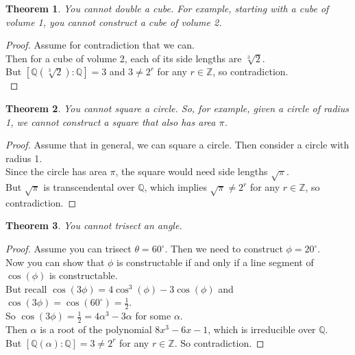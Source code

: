 \documentclass[11pt]{amsart}
\newtheorem{theorem}{Theorem}[section]
\theoremstyle{definition}
\newcommand{\rationals}{\mathbb{Q}}
\newcommand{\integers}{\mathbb{Z}}
\begin{document}
\begin{theorem}
	You cannot double a cube. For example, starting with a cube of volume 1, you cannot construct a cube of volume 2.
\end{theorem}
\begin{proof}
	Assume for contradiction that we can. \\
	Then for a cube of volume 2, each of its side lengths are $\sqrt[3]{2}$. \\
	But $[ \rationals(\sqrt[3]{2}) : \rationals ] = 3$ and $3 \neq 2^r$ for any $r \in \integers$, so contradiction. \\
\end{proof}
\begin{theorem}
	You cannot square a circle. So, for example, given a circle of radius 1, we cannot construct a square that also has area $\pi$.
\end{theorem}
\begin{proof}
	Assume that in general, we can square a circle. Then consider a circle with radius 1. \\
	Since the circle has area $\pi$, the square would need side lengths $\sqrt{\pi}$. \\
	But $\sqrt{\pi}$ is transcendental over $\rationals$, which implies $\sqrt{\pi} \neq 2^r$ for any $r \in \integers$, so contradiction.
\end{proof}
\begin{theorem}
	You cannot trisect an angle.
\end{theorem}
\begin{proof}
	Assume you can trisect $\theta = 60^\circ$. Then we need to construct $\phi = 20^\circ$. \\
	Now you can show that $\phi$ is constructable if and only if a line segment of $\cos(\phi)$ is constructable. \\
	But recall $\cos(3\phi) = 4\cos^3(\phi) - 3\cos(\phi)$ and $\cos(3\phi) = \cos(60^\circ) = \frac{1}{2}$. \\
	So $\cos(3\phi) = \frac{1}{2} = 4\alpha^3 - 3\alpha$ for some $\alpha$. \\
	Then $\alpha$ is a root of the polynomial $8x^3 - 6x -1$, which is irreducible over $\rationals$. \\
	But $[ \rationals(\alpha) : \rationals ] = 3 \neq 2^r$ for any $r \in \integers$. So contradiction.
\end{proof}

\newpage
\end{document}
